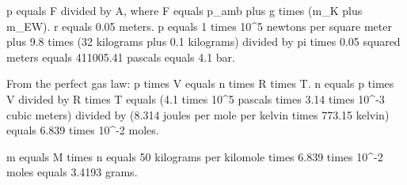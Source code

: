 p equals F divided by A, where F equals p_amb plus g times (m_K plus m_EW).  
r equals 0.05 meters.  
p equals 1 times 10^5 newtons per square meter plus 9.8 times (32 kilograms plus 0.1 kilograms) divided by pi times 0.05 squared meters equals 411005.41 pascals equals 4.1 bar.  

From the perfect gas law:  
p times V equals n times R times T.  
n equals p times V divided by R times T equals (4.1 times 10^5 pascals times 3.14 times 10^-3 cubic meters) divided by (8.314 joules per mole per kelvin times 773.15 kelvin) equals 6.839 times 10^-2 moles.  

m equals M times n equals 50 kilograms per kilomole times 6.839 times 10^-2 moles equals 3.4193 grams.